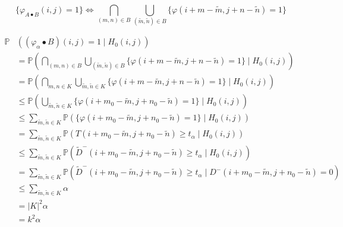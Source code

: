 \documentclass[a4paper,12pt]{article}
\newcommand{\abs}[1]{\lvert#1\rvert}
\theoremstyle{plain}
\theoremstyle{definition}
\theoremstyle{remark}
\begin{document}
\begin{equation}
	\{ \varphi_{A \bullet B}(i, j) = 1 \} \Leftrightarrow \bigcap_{(m, n) \in B} \bigcup_{(\tilde{m}, \tilde{n}) \in B} \{ \varphi(i + m - \tilde{m}, j + n - \tilde{n}) = 1 \}
\end{equation}

\begin{align*}
	\mathbb{P}&( (\varphi_\alpha \bullet B)(i, j) = 1 \mid H_0(i, j) ) \\
	&= \mathbb{P}\left( \bigcap_{(m, n) \in B} \bigcup_{(\tilde{m}, \tilde{n}) \in B} \{ \varphi(i + m - \tilde{m}, j + n - \tilde{n}) = 1 \} \mid H_0(i, j) \right) \\
	&= \mathbb{P}\left( \bigcap_{m, n \in K} \bigcup_{\tilde{m}, \tilde{n} \in K} \{ \varphi(i + m - \tilde{m}, j + n - \tilde{n}) = 1 \} \mid H_0(i, j) \right) \\
	&\leq \mathbb{P}\left( \bigcup_{\tilde{m}, \tilde{n} \in K} \{ \varphi(i + m_0 - \tilde{m}, j + n_0 - \tilde{n}) = 1 \} \mid H_0(i, j) \right) \\
	&\leq \sum_{\tilde{m}, \tilde{n} \in K} \mathbb{P}( \{ \varphi(i + m_0 - \tilde{m}, j + n_0 - \tilde{n}) = 1 \} \mid H_0(i, j) ) \\
	&= \sum_{\tilde{m}, \tilde{n} \in K} \mathbb{P}( T(i + m_0 - \tilde{m}, j + n_0 - \tilde{n}) \geq t_\alpha \mid H_0(i, j) ) \\
	&\leq \sum_{\tilde{m}, \tilde{n} \in K} \mathbb{P}( \tilde{D}^-(i + m_0 - \tilde{m}, j + n_0 - \tilde{n}) \geq t_\alpha \mid H_0(i, j) ) \\
	&= \sum_{\tilde{m}, \tilde{n} \in K} \mathbb{P}( \tilde{D}^-(i + m_0 - \tilde{m}, j + n_0 - \tilde{n}) \geq t_\alpha \mid D^-(i + m_0 - \tilde{m}, j + n_0 - \tilde{n}) = 0 ) \\
	&\leq \sum_{\tilde{m}, \tilde{n} \in K} \alpha \\
	&= \abs{K}^2 \alpha \\
	&= k^2 \alpha
\end{align*}
\end{document}
